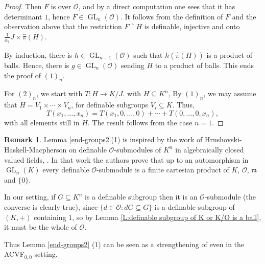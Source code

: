 \documentclass[11pt]{amsart}
\DeclareMathOperator{\gl}{GL} \DeclareMathOperator{\agl}{AGL}
\theoremstyle{definition}
\newtheorem{remark}[theorem]{Remark}
\newcommand{\CO}{{\mathcal O}}
\newcommand{\0}{\emptyset}
\def\bm{\mathfrak m}
\def\sub{\subseteq}
\begin{document}
\begin{proof}
Then $F$ is over $\CO$, and by a direct computation one sees that it has determinant $1$, hence $F\in \gl_n(\CO)$. It follows from the definition of $F$ and the observation above that the restriction $F\restriction H$ is definable, injective and onto $\frac{1}{\alpha_1}J\times \hat \pi(H)$. 


By induction, there is $h\in \gl_{n-1}(\CO)$ such that $h(\hat \pi (H))$ is a product of balls. Hence, there is $g\in \gl_n(\CO)$ sending $H$ to a product of balls. This ends the proof of $(1)_n$. 

For $(2)_n$, we start with $T:H\to K/J$. with $H\subseteq K^n$, By $(1)_n$, we may assume that $H=V_1\times \cdots \times V_n$, for definable subgroups $V_i\subseteq K$. Thus, 
\[T(x_1,\ldots, x_n)=T(x_1,0,\ldots, 0)+\cdots +T(0,\ldots, 0,x_n),\] with all elements still in $H$. The result follows from  the case $n=1$.
\end{proof}

\begin{remark}
     Lemma \ref{end-groups2}(1) is inspired by the work of Hrushovski-Haskell-Macpherson on  definable $\CO$-submodules of $K^n$ in algebraically closed valued fields,  \cite[Lemma 2.2.4]{HaHrMac1}. In that work the authors prove that up to an automorphism in $\gl_n(K)$ every definable $\CO$-submodule is a finite cartesian product of $K$, $\CO$, $\bm$ and $\{0\}$. 

    In our setting, if $G\sub K^n$ is a definable subgroup then it is an  $\CO$-submodule (the converse is clearly true), since  $\{d\in \CO:dG\sub G\}$ is a definable subgroup of $(K,+)$ containing $1$, so by Lemma \ref{L:definable subgroup of K or K/O is a ball}, it must be the whole of $\CO$.

    Thus Lemma \ref{end-groups2} (1) can be seen as a strengthening of
\cite[Lemma 2.2.4]{HaHrMac1} even in the ACVF$_{0,0}$ setting.
\end{remark} 
\end{document}
